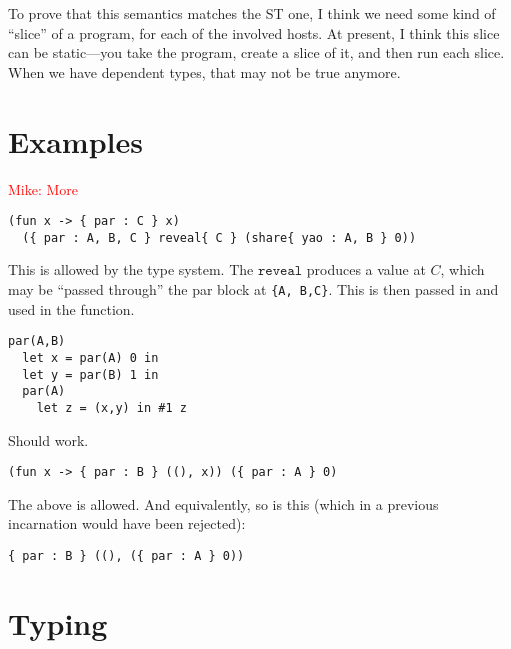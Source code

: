 \documentclass[10pt]{article}
\newcommand{\kw}[1]{\ensuremath{\mathtt{#1}}}
\newcommand{\mwh}[1]{\textcolor{red}{Mike: #1}}
\begin{document}
To prove that this semantics matches the ST one, I think we need some
kind of ``slice'' of a program, for each of the involved hosts. At
present, I think this slice can be static---you take the program,
create a slice of it, and then run each slice. When we have dependent
types, that may not be true anymore.

\section{Examples}

\mwh{More}

\begin{verbatim}
(fun x -> { par : C } x) 
  ({ par : A, B, C } reveal{ C } (share{ yao : A, B } 0))
\end{verbatim}
This is allowed by the type system. The $\kw{reveal}$ produces a value
at $C$, which may be ``passed through'' the par block at \verb+{A, B,C}+. 
This is then passed in and used in the function.

\begin{verbatim}
par(A,B) 
  let x = par(A) 0 in
  let y = par(B) 1 in
  par(A) 
    let z = (x,y) in #1 z
\end{verbatim}
Should work.

\begin{verbatim}
(fun x -> { par : B } ((), x)) ({ par : A } 0)
\end{verbatim}
The above is allowed. And equivalently, so is this (which in a
previous incarnation would have been rejected):
\begin{verbatim}
{ par : B } ((), ({ par : A } 0))
\end{verbatim}

\section{Typing}
\end{document}

